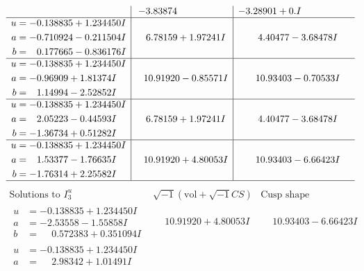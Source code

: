 \documentclass[1p]{elsarticle_modified}
\theoremstyle{definition}
\newcommand{\I}{\sqrt{-1}}
\begin{document}
$$\begin{array}{c|c|c}
 & -3.83874\phantom{ +0.000000I} & -3.28901 + 0. I\phantom{ +0.000000I} \\ \hline\begin{aligned}
u &= -0.138835 + 1.234450 I \\
a &= -0.710924 - 0.211504 I \\
b &= \phantom{-}0.177665 - 0.836176 I\end{aligned}
 & \phantom{-}6.78159 + 1.97241 I & \phantom{-}4.40477 - 3.68478 I \\ \hline\begin{aligned}
u &= -0.138835 + 1.234450 I \\
a &= -0.96909 + 1.81374 I \\
b &= \phantom{-}1.14994 - 2.52852 I\end{aligned}
 & \phantom{-}10.91920 - 0.85571 I & \phantom{-}10.93403 - 0.70533 I \\ \hline\begin{aligned}
u &= -0.138835 + 1.234450 I \\
a &= \phantom{-}2.05223 - 0.44593 I \\
b &= -1.36734 + 0.51282 I\end{aligned}
 & \phantom{-}6.78159 + 1.97241 I & \phantom{-}4.40477 - 3.68478 I \\ \hline\begin{aligned}
u &= -0.138835 + 1.234450 I \\
a &= \phantom{-}1.53377 - 1.76635 I \\
b &= -1.76314 + 2.25582 I\end{aligned}
 & \phantom{-}10.91920 + 4.80053 I & \phantom{-}10.93403 - 6.66423 I\\
 \hline 
 \end{array}$$\newpage$$\begin{array}{c|c|c}  
\text{Solutions to }I^u_{3}& \I (\text{vol} + \sqrt{-1}CS) & \text{Cusp shape}\\
 \hline 
\begin{aligned}
u &= -0.138835 + 1.234450 I \\
a &= -2.53558 - 1.55858 I \\
b &= \phantom{-}0.572383 + 0.351094 I\end{aligned}
 & \phantom{-}10.91920 + 4.80053 I & \phantom{-}10.93403 - 6.66423 I \\ \hline\begin{aligned}
u &= -0.138835 + 1.234450 I \\
a &= \phantom{-}2.98342 + 1.01491 I \\

\end{aligned}
\end{array}$$
\end{document}
